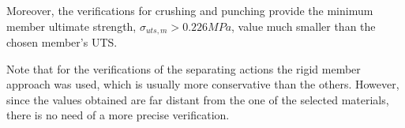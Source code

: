 Moreover, the verifications for crushing and punching provide the minimum member ultimate strength, $\sigma_{uts,m} > 0.226 MPa$, value much smaller than the chosen member's UTS.

Note that for the verifications of the separating actions the rigid member approach was used, which is usually more conservative than the others. However, since the values obtained are far distant from the one of the selected materials, there is no need of a more precise verification.